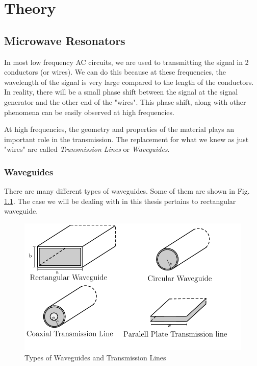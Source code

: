 
\chapter{Theory} %

\label{Chapter2} %


\section{Microwave Resonators}

In most low frequency AC circuits, we are used to transmitting the signal in 2 conductors (or wires). We can do this because at these frequencies, the wavelength of the signal is very large compared to the length of the conductors. In reality, there will be a small phase shift between the signal at the signal generator and the other end of the "wires". This phase shift, along with other phenomena can be easily observed at high frequencies.

At high frequencies, the geometry and properties of the material plays an important role in the transmission. The replacement for what we knew as just "wires" are called \textit{Transmission Lines} or \textit{Waveguides}.

\subsection{Waveguides}

There are many different types of waveguides. Some of them are shown in Fig. \ref{fig:waveguides}. The case we will be dealing with in this thesis pertains to rectangular waveguide.

\begin{figure}
\centering
\includegraphics{Figures/Waveguides}
\decoRule
\caption[Waveguide Types]{Types of Waveguides and Transmission Lines}
\label{fig:waveguides}
\end{figure}

